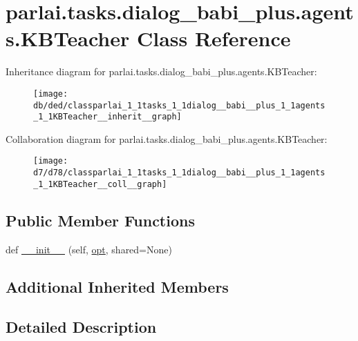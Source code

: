 \hypertarget{classparlai_1_1tasks_1_1dialog__babi__plus_1_1agents_1_1KBTeacher}{}\section{parlai.\+tasks.\+dialog\+\_\+babi\+\_\+plus.\+agents.\+K\+B\+Teacher Class Reference}
\label{classparlai_1_1tasks_1_1dialog__babi__plus_1_1agents_1_1KBTeacher}


Inheritance diagram for parlai.\+tasks.\+dialog\+\_\+babi\+\_\+plus.\+agents.\+K\+B\+Teacher\+:\nopagebreak
\begin{figure}[H]
\begin{center}
\leavevmode
\texttt{[image: db/ded/classparlai\_1\_1tasks\_1\_1dialog\_\_babi\_\_plus\_1\_1agents\_1\_1KBTeacher\_\_inherit\_\_graph]}
\end{center}
\end{figure}


Collaboration diagram for parlai.\+tasks.\+dialog\+\_\+babi\+\_\+plus.\+agents.\+K\+B\+Teacher\+:\nopagebreak
\begin{figure}[H]
\begin{center}
\leavevmode
\texttt{[image: d7/d78/classparlai\_1\_1tasks\_1\_1dialog\_\_babi\_\_plus\_1\_1agents\_1\_1KBTeacher\_\_coll\_\_graph]}
\end{center}
\end{figure}
\subsection*{Public Member Functions}
\begin{DoxyCompactItemize}
\item 
def \hyperlink{classparlai_1_1tasks_1_1dialog__babi__plus_1_1agents_1_1KBTeacher_aa291d9b9f60df40b085271f0dd7d3b0e}{\+\_\+\+\_\+init\+\_\+\+\_\+} (self, \hyperlink{classparlai_1_1core_1_1teachers_1_1FbDialogTeacher_af7a9ec497b9cd0292d7b8fa220da7c28}{opt}, shared=None)
\end{DoxyCompactItemize}
\subsection*{Additional Inherited Members}


\subsection{Detailed Description}


